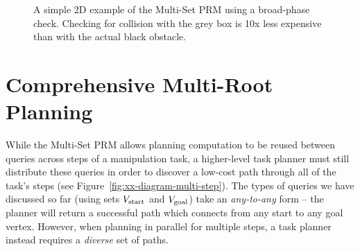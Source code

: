 \begin{figure}
   \caption{A simple 2D example of the Multi-Set PRM using
     a broad-phase check.
     Checking for collision with the grey box is 10x less expensive
     than with the actual black obstacle.
     }
   \label{fig:broad-phase-2d}
\end{figure}


\clearpage
\section{Comprehensive Multi-Root Planning}
\label{chap:cmr}

While the Multi-Set PRM
allows planning computation to be reused between queries
across steps of a manipulation task,
a higher-level task planner must still distribute these queries
in order to discover a low-cost path
through all of the task's steps
(see Figure~\ref{fig:xx-diagram-multi-step}).
The types of queries we have discussed so far
(using sets
$V_{\mbox{\scriptsize start}}$ and $V_{\mbox{\scriptsize goal}}$)
take an \emph{any-to-any} form
-- the planner will return a successful path which connects
from any start to any goal vertex.
However,
when planning in parallel for multiple steps,
a task planner instead requires a \emph{diverse} set of
paths.

